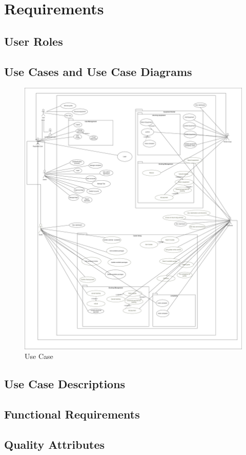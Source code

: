 \section{Requirements}
\subsection{User Roles}


\newpage
\subsection{Use Cases and Use Case Diagrams}
\begin{figure}[h!]
    \centering
    \includegraphics[width=1\textwidth]{Images/usecase.png}
    \caption{Use Case}
    \label{fig:enter-label}
\end{figure}
\clearpage

\subsection{Use Case Descriptions}

\newpage

\subsection{Functional Requirements}

\newpage

\subsection{Quality Attributes}


